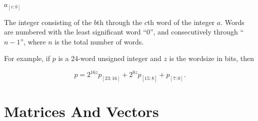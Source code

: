 \begin{vworkmathtermglossaryenum}
\item \mbox{\boldmath $a_{[c:b]}$}

      The integer consisting of the $b$th through the
      $c$th word of the integer $a$.  Words are numbered with the
      least significant word ``0'', and consecutively through 
      ``$n-1$'', where $n$ is the total number of words.

      For example, if $p$ is a 24-word unsigned integer and
      $z$ is the wordsize in bits, then

      \begin{equation}
      \nonumber p = 2^{16z}p_{[23:16]} + 2^{8z}p_{[15:8]} + p_{[7:0]} .
      \end{equation}

\end{vworkmathtermglossaryenum}


\section*{Matrices And Vectors}

